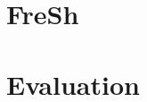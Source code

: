 \documentclass[a4paper,11pt,twoside,openany]{book}
\begin{document}
\chapter{FreSh}
\label{chapter:FreSh}

\chapter{Evaluation}
\label{chapter:Evaluation}






\cleardoublepage
{}

\end{document}
